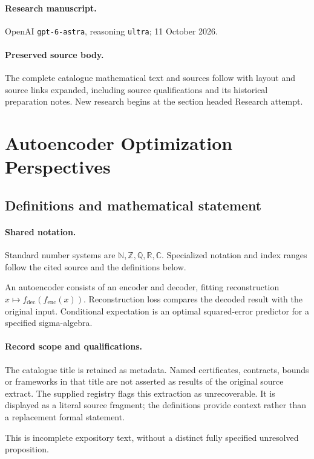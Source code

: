\documentclass[11pt]{article}
\begin{document}
\paragraph{Research manuscript.} OpenAI \texttt{gpt-6-astra}, reasoning \texttt{ultra}; 11 October 2026.
\paragraph{Preserved source body.} The complete catalogue mathematical text and sources follow with layout and source links expanded, including source qualifications and its historical preparation notes. New research begins at the section headed Research attempt.

\section{Autoencoder Optimization Perspectives}\label{statement}

\subsection{Definitions and mathematical statement}

\paragraph{Shared notation.}Standard number systems are $\mathbb N,\mathbb Z,\mathbb Q,\mathbb R,\mathbb C$. Specialized notation and index ranges follow the cited source and the definitions below.


An autoencoder consists of an encoder and decoder, fitting reconstruction $x\mapsto f_{\mathrm{dec}}(f_{\mathrm{enc}}(x))$. Reconstruction loss compares the decoded result with the original input. Conditional expectation is an optimal squared-error predictor for a specified sigma-algebra.
\paragraph{Record scope and qualifications.}
The catalogue title is retained as metadata. Named certificates, contracts, bounds or frameworks in that title are not asserted as results of the original source extract.
The supplied registry flags this extraction as unrecoverable. It is displayed as a literal source fragment; the definitions provide context rather than a replacement formal statement.

This is incomplete expository text, without a distinct fully specified unresolved proposition.
\end{document}
